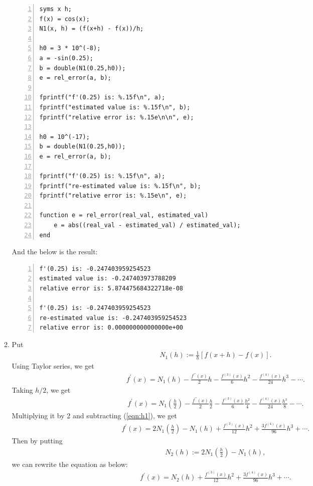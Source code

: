 \documentclass{article}
\begin{document}
\begin{enumerate}
\begin{enumerate}[wide=10pt]
\begin{lstlisting}[frame=single, numbers=left, style=Matlab-editor]
syms x h;
f(x) = cos(x);
N1(x, h) = (f(x+h) - f(x))/h;

h0 = 3 * 10^(-8);
a = -sin(0.25);
b = double(N1(0.25,h0));
e = rel_error(a, b);

fprintf("f'(0.25) is: %.15f\n", a);
fprintf("estimated value is: %.15f\n", b);
fprintf("relative error is: %.15e\n\n", e);

h0 = 10^(-17);
b = double(N1(0.25,h0));
e = rel_error(a, b);

fprintf("f'(0.25) is: %.15f\n", a);
fprintf("re-estimated value is: %.15f\n", b);
fprintf("relative error is: %.15e\n", e);

function e = rel_error(real_val, estimated_val)
    e = abs((real_val - estimated_val) / estimated_val);
end
        \end{lstlisting} And the below is the result: \begin{lstlisting}[frame=single, numbers=left, style=Matlab-editor]
f'(0.25) is: -0.247403959254523
estimated value is: -0.247403973788209
relative error is: 5.874475684322718e-08

f'(0.25) is: -0.247403959254523
re-estimated value is: -0.247403959254523
relative error is: 0.000000000000000e+00
        \end{lstlisting}
        \item Put \begin{align}
            N_1(h) := \frac{1}{h}[f(x+h)-f(x)].
        \end{align} Using Taylor series, we get \begin{align} \label{eqn:h1}
            f^\prime(x) = N_1(h) -\frac{f^{\prime\prime}(x)}{2}h - \frac{f^{(3)}(x)}{6}h^2 - \frac{f^{(4)}(x)}{24}h^3 - \cdots.
        \end{align} Taking $h/2$, we get \begin{align*}
            f^\prime(x) = N_1 \left (\frac{h}{2} \right ) -\frac{f^{\prime\prime}(x)}{2}\frac{h}{2} - \frac{f^{(3)}(x)}{6}\frac{h^2}{4} - \frac{f^{(4)}(x)}{24}\frac{h^3}{8} - \cdots.
        \end{align*} Multiplying it by 2 and subtracting (\ref{eqn:h1}), we get \begin{align*}
            f^\prime(x) = 2N_1 \left (\frac{h}{2} \right ) - N_1(h) + \frac{f^{(3)}(x)}{12}h^2 + \frac{3f^{(4)}(x)}{96}h^3 + \cdots.
        \end{align*} Then by putting \begin{align}
            N_2(h) := 2N_1 \left (\frac{h}{2} \right ) - N_1(h),
        \end{align} we can rewrite the equation as below: \begin{align} \label{eqn:h2}
            f^\prime(x) = N_2(h) + \frac{f^{(3)}(x)}{12}h^2 + \frac{3f^{(4)}(x)}{96}h^3 + \cdots.
        \end{align}
        

\end{enumerate}
\end{enumerate}
\end{document}
